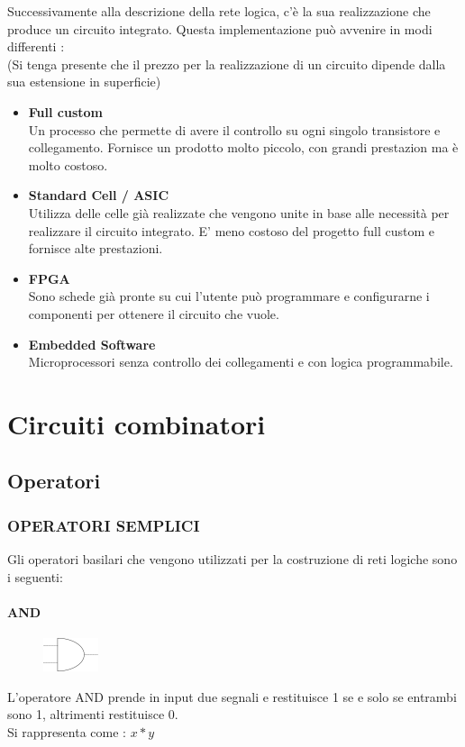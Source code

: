 \documentclass[a4paper]{book}
\begin{document}
Successivamente alla descrizione della rete logica, c'è la sua realizzazione che produce un circuito integrato. 
Questa implementazione può avvenire in modi differenti :
\\(Si tenga presente che il prezzo per la realizzazione di un circuito dipende dalla sua estensione in superficie)

\begin{itemize}
\item
	\textbf{Full custom}\\
Un processo che permette di avere il controllo su ogni singolo transistore e collegamento. Fornisce un prodotto molto piccolo, con grandi prestazion ma è molto costoso. 
\item
	\textbf{Standard Cell / ASIC}\\
Utilizza delle celle già realizzate che vengono unite in base alle necessità per realizzare il circuito integrato.
E' meno costoso del progetto full custom e fornisce alte prestazioni.
\item
	\textbf{FPGA}\\
Sono schede già pronte su cui l'utente può programmare e configurarne i componenti per ottenere il circuito che vuole.
\item
	\textbf{Embedded Software}\\
Microprocessori senza controllo dei collegamenti e con logica programmabile.
\end{itemize}

\chapter{Circuiti combinatori}
\section{Operatori}
\subsection{OPERATORI SEMPLICI}
Gli operatori basilari che vengono utilizzati per la costruzione di reti logiche sono i seguenti:\\
\subsubsection*{AND}
\begin{figure}
\includegraphics{AndPrecisa}
\end{figure}
L'operatore AND prende in input  due segnali e restituisce 1 se e solo se entrambi sono 1, altrimenti restituisce 0.
\\ Si rappresenta come : \(x*y\)\\
\end{document}
